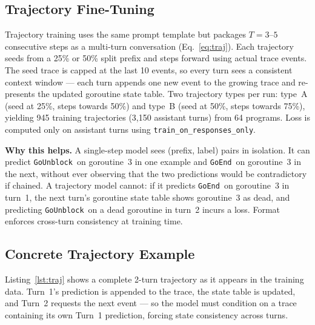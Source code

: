 \documentclass[10pt,conference]{IEEEtran}
\newcommand{\eunblock}{\texttt{GoUnblock}}
\newcommand{\eend}{\texttt{GoEnd}}
\begin{document}
\subsection{Trajectory Fine-Tuning}\label{sec:traj}

Trajectory training uses the same prompt template but packages
$T{=}3\text{--}5$ consecutive steps as a multi-turn conversation
(Eq.~\eqref{eq:traj}).
Each trajectory seeds from a 25\% or 50\% split prefix and steps
forward using actual trace events.
The seed trace is capped at the last 10 events, so every turn sees
a consistent context window — each turn appends one new event to the
growing trace and re-presents the updated goroutine state table.
Two trajectory types per run: type~A (seed at 25\%, steps towards 50\%)
and type~B (seed at 50\%, steps towards 75\%), yielding 945 training
trajectories (3,150 assistant turns) from 64 programs.
Loss is computed only on assistant turns using
\texttt{train\_on\_responses\_only}.

\textbf{Why this helps.}
A single-step model sees (prefix, label) pairs in isolation.
It can predict \eunblock\ on goroutine~3 in one example and \eend\
on goroutine~3 in the next, without ever observing that the two
predictions would be contradictory if chained.
A trajectory model cannot: if it predicts \eend\ on goroutine~3 in
turn~1, the next turn's goroutine state table shows goroutine~3 as
dead, and predicting \eunblock\ on a dead goroutine in turn~2
incurs a loss.
Format enforces cross-turn consistency at training time.

\subsection{Concrete Trajectory Example}\label{sec:traj-example}

Listing~\ref{lst:traj} shows a complete 2-turn trajectory as it
appears in the training data.
Turn~1's prediction is appended to the trace, the state table is
updated, and Turn~2 requests the next event — so the model must
condition on a trace containing its own Turn~1 prediction, forcing
state consistency across turns.
\end{document}
